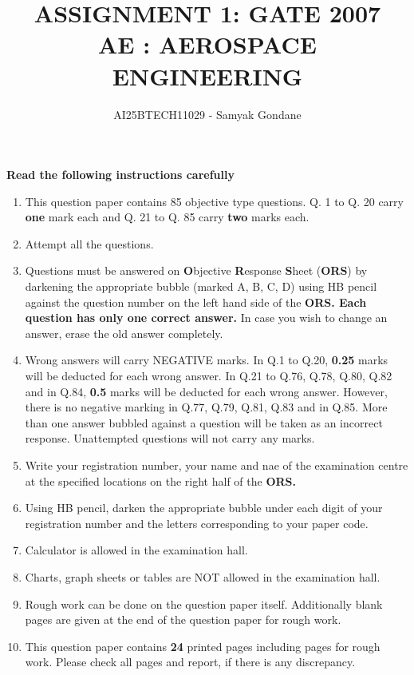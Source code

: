 \documentclass{article}
\begin{document}
\title{
ASSIGNMENT 1: GATE 2007 \\
    AE : AEROSPACE ENGINEERING }
\author{AI25BTECH11029 - Samyak Gondane }
\maketitle


\begin{center}
    \textbf{Read the following instructions carefully}
\end{center}
\begin{enumerate}
    \item This question paper contains 85 objective type questions. Q. 1 to Q. 20 carry \textbf{one} mark each and Q. 21 to Q. 85 carry \textbf{two} marks each.
    \item Attempt all the questions.
    \item Questions must be answered on \textbf{O}bjective \textbf{R}esponse \textbf{S}heet (\textbf{ORS}) by darkening the appropriate bubble (marked A, B, C, D) using HB pencil against the question number on the left hand side of the \textbf{ORS. Each question has only one correct answer.} In case you wish to change an answer, erase the old answer completely.
    \item Wrong answers will carry NEGATIVE marks. In Q.1 to Q.20, \textbf{0.25} marks will be deducted for each wrong answer. In Q.21 to Q.76, Q.78, Q.80, Q.82 and in Q.84, \textbf{0.5} marks will be deducted for each wrong answer. However, there is no negative marking in Q.77, Q.79, Q.81, Q.83 and in Q.85. More than one answer bubbled against a question will be taken as an incorrect response. Unattempted questions  will not carry any marks.
    \item Write your registration number, your name and nae of the examination centre at the specified locations on the right half of the \textbf{ORS.}
    \item Using HB pencil, darken the appropriate bubble under each digit of your registration number and the letters corresponding to your paper code.
    \item Calculator is allowed in the examination hall.
    \item Charts, graph sheets or tables are NOT allowed in the examination hall.
    \item Rough work can be done on the question paper itself. Additionally blank pages are given at the end of the question paper for rough work.
    \item This question paper contains \textbf{24} printed pages including pages for rough work. Please check all pages and report, if there is any discrepancy.
\end{enumerate}
\end{document}
